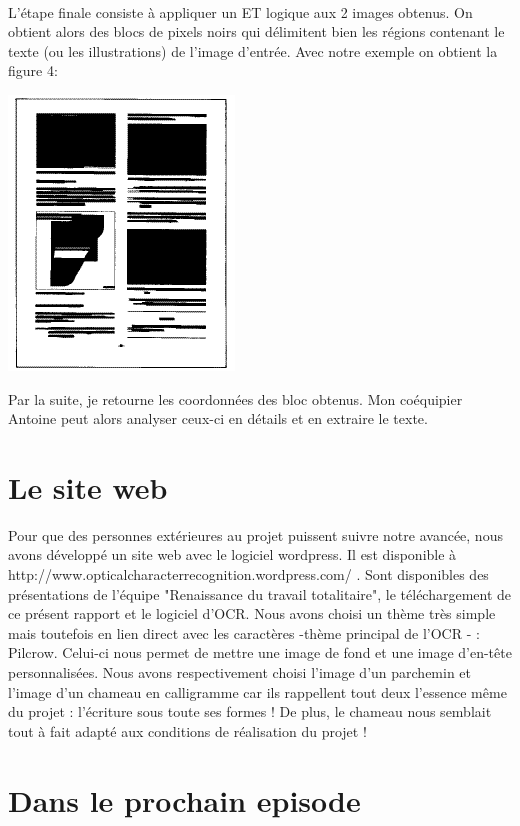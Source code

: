 \documentclass [french,12pt]{article}
\begin{document}
\\
L'étape finale consiste à appliquer un ET logique aux 2 images obtenus. On obtient alors des blocs de pixels noirs qui délimitent bien les régions contenant le texte (ou les illustrations) de l'image d'entrée. Avec notre exemple on obtient la figure 4:

\begin{center} \includegraphics[scale=0.4]{rlsa_fig4} \end{center}

Par la suite, je retourne les coordonnées des bloc obtenus.
Mon coéquipier Antoine peut alors analyser ceux-ci en détails et en extraire le texte.

\section{Le site web}
Pour que des personnes extérieures au projet puissent suivre notre avancée, nous avons développé un site web avec le logiciel wordpress. Il est disponible à http://www.opticalcharacterrecognition.wordpress.com/ . Sont disponibles des présentations de l'équipe "Renaissance du travail totalitaire", le téléchargement de ce présent rapport et le logiciel d'OCR. Nous avons choisi un thème très simple mais toutefois en lien direct avec les caractères -thème principal de l'OCR - : Pilcrow. Celui-ci nous permet de mettre une image de fond et une image d'en-tête personnalisées. Nous avons respectivement choisi l'image d'un parchemin et l'image d'un chameau en calligramme car ils rappellent tout deux l'essence même du projet : l'écriture sous toute ses formes ! De plus, le chameau nous semblait tout à fait adapté aux conditions de réalisation du projet ! 

\section{Dans le prochain episode}
\end{document}
